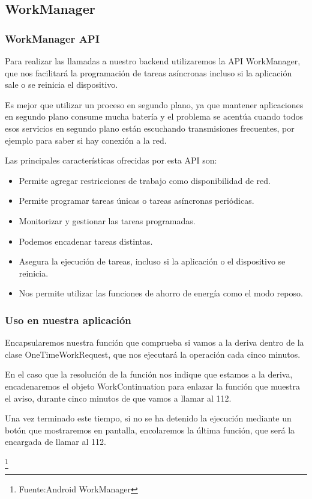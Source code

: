 \label{jobscheduler}

\subsection{WorkManager}
\subsubsection{WorkManager API}
Para realizar las llamadas a nuestro backend utilizaremos la API WorkManager, que nos facilitará la programación de tareas asíncronas incluso si la aplicación sale o se reinicia el dispositivo.

Es mejor que utilizar un proceso en segundo plano, ya que mantener aplicaciones en segundo plano consume mucha batería y el problema se acentúa cuando todos esos servicios en segundo plano están escuchando transmisiones frecuentes, por ejemplo para saber si hay conexión a la red.

Las principales características ofrecidas por esta API son:

\begin{itemize}
\item Permite agregar restricciones de trabajo como disponibilidad de red.
\item Permite programar tareas únicas o tareas asíncronas periódicas.
\item Monitorizar y gestionar las tareas programadas.
\item Podemos encadenar tareas distintas.
\item Asegura la ejecución de tareas, incluso si la aplicación o el dispositivo se reinicia.
\item Nos permite utilizar las funciones de ahorro de energía como el modo reposo.
\end{itemize}

\subsubsection{Uso en nuestra aplicación}

Encapsularemos nuestra función que comprueba si vamos a la deriva dentro de la clase OneTimeWorkRequest, que nos ejecutará la operación cada cinco minutos.

En el caso que la resolución de la función nos indique que estamos a la deriva, encadenaremos el objeto WorkContinuation para enlazar la función que muestra el aviso, durante cinco minutos de que vamos a llamar al 112.

Una vez terminado este tiempo, si no se ha detenido la ejecución mediante un botón que mostraremos en pantalla, encolaremos la última función, que será la encargada de llamar al 112.


\footnote{Fuente:Android WorkManager\cite{ANDROIDWORKMANAGER}}